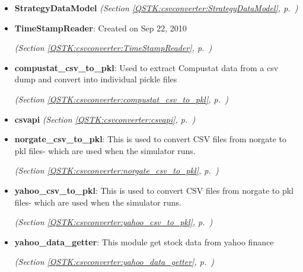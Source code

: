 \begin{itemize}
\setlength{\parskip}{0ex}
\item \textbf{StrategyDataModel}
  \textit{(Section \ref{QSTK:csvconverter:StrategyDataModel}, p.~\pageref{QSTK:csvconverter:StrategyDataModel})}

\item \textbf{TimeStampReader}: Created on Sep 22, 2010



  \textit{(Section \ref{QSTK:csvconverter:TimeStampReader}, p.~\pageref{QSTK:csvconverter:TimeStampReader})}

\item \textbf{compustat\_csv\_to\_pkl}: Used to extract Compustat data from a csv dump and convert into individual 
pickle files



  \textit{(Section \ref{QSTK:csvconverter:compustat_csv_to_pkl}, p.~\pageref{QSTK:csvconverter:compustat_csv_to_pkl})}

\item \textbf{csvapi}
  \textit{(Section \ref{QSTK:csvconverter:csvapi}, p.~\pageref{QSTK:csvconverter:csvapi})}

\item \textbf{norgate\_csv\_to\_pkl}: This is used to convert CSV files from norgate to pkl files- which are used
when the simulator runs.



  \textit{(Section \ref{QSTK:csvconverter:norgate_csv_to_pkl}, p.~\pageref{QSTK:csvconverter:norgate_csv_to_pkl})}

\item \textbf{yahoo\_csv\_to\_pkl}: This is used to convert CSV files from norgate to pkl files- which are used
when the simulator runs.



  \textit{(Section \ref{QSTK:csvconverter:yahoo_csv_to_pkl}, p.~\pageref{QSTK:csvconverter:yahoo_csv_to_pkl})}

\item \textbf{yahoo\_data\_getter}: This module get stock data from yahoo finance



  \textit{(Section \ref{QSTK:csvconverter:yahoo_data_getter}, p.~\pageref{QSTK:csvconverter:yahoo_data_getter})}

\end{itemize}



